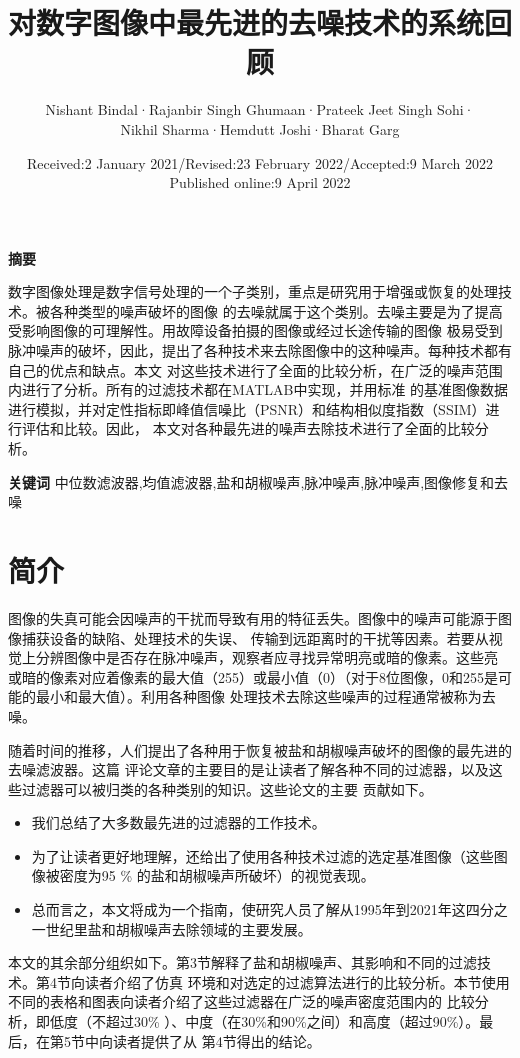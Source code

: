 \documentclass[12pt]{article} %
\title{对数字图像中最先进的去噪技术的系统回顾}  %
\author{Nishant Bindal·Rajanbir Singh Ghumaan·Prateek Jeet Singh Sohi·
 \\Nikhil Sharma·Hemdutt Joshi·Bharat Garg}%
\date{Received:2 January 2021/Revised:23 February 2022/Accepted:9 March 2022
\\Published online:9 April 2022}       %
\begin{document}
\maketitle          %

\textbf{摘要}

数字图像处理是数字信号处理的一个子类别，重点是研究用于增强或恢复的处理技术。被各种类型的噪声破坏的图像
的去噪就属于这个类别。去噪主要是为了提高受影响图像的可理解性。用故障设备拍摄的图像或经过长途传输的图像
极易受到脉冲噪声的破坏，因此，提出了各种技术来去除图像中的这种噪声。每种技术都有自己的优点和缺点。本文
对这些技术进行了全面的比较分析，在广泛的噪声范围内进行了分析。所有的过滤技术都在MATLAB中实现，并用标准
的基准图像数据进行模拟，并对定性指标即峰值信噪比（PSNR）和结构相似度指数（SSIM）进行评估和比较。因此，
本文对各种最先进的噪声去除技术进行了全面的比较分析。
\bigskip

\textbf{关键词}
\quad 中位数滤波器,均值滤波器,盐和胡椒噪声,脉冲噪声,脉冲噪声,图像修复和去噪

\section{简介}
图像的失真可能会因噪声的干扰而导致有用的特征丢失。图像中的噪声可能源于图像捕获设备的缺陷、处理技术的失误、
传输到远距离时的干扰等因素。若要从视觉上分辨图像中是否存在脉冲噪声，观察者应寻找异常明亮或暗的像素。这些亮
或暗的像素对应着像素的最大值（255）或最小值（0）（对于8位图像，0和255是可能的最小和最大值）。利用各种图像
处理技术去除这些噪声的过程通常被称为去噪。\par

\hspace{2em}随着时间的推移，人们提出了各种用于恢复被盐和胡椒噪声破坏的图像的最先进的去噪滤波器。这篇
评论文章的主要目的是让读者了解各种不同的过滤器，以及这些过滤器可以被归类的各种类别的知识。这些论文的主要
贡献如下。

\begin{itemize}
\item 我们总结了大多数最先进的过滤器的工作技术。
\item 为了让读者更好地理解，还给出了使用各种技术过滤的选定基准图像（这些图像被密度为95 \% 的盐和胡椒噪声所破坏）的视觉表现。
\item 总而言之，本文将成为一个指南，使研究人员了解从1995年到2021年这四分之一世纪里盐和胡椒噪声去除领域的主要发展。
\end{itemize}

\hspace{2em}本文的其余部分组织如下。第3节解释了盐和胡椒噪声、其影响和不同的过滤技术。第4节向读者介绍了仿真
环境和对选定的过滤算法进行的比较分析。本节使用不同的表格和图表向读者介绍了这些过滤器在广泛的噪声密度范围内的
比较分析，即低度（不超过30\% ）、中度（在30\%和90\%之间）和高度（超过90\%）。最后，在第5节中向读者提供了从
第4节得出的结论。
\end{document}
